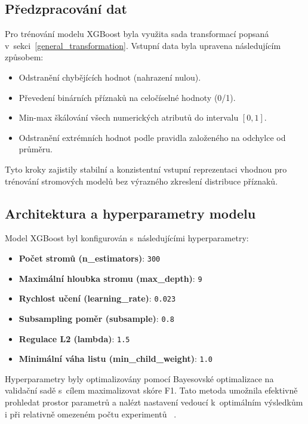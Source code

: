 \subsection{Předzpracování dat}

Pro trénování modelu XGBoost byla využita  sada transformací popsaná v~sekci~\ref{general_transformation}. Vstupní data byla upravena následujícím způsobem:
\begin{itemize}
    \item Odstranění chybějících hodnot (nahrazení nulou).
    \item Převedení binárních příznaků na celočíselné hodnoty (0/1).
    \item Min-max škálování všech numerických atributů do intervalu $[0, 1]$.
    \item Odstranění extrémních hodnot podle pravidla založeného na odchylce od průměru.
\end{itemize}

\noindent Tyto kroky zajistily stabilní a konzistentní vstupní reprezentaci vhodnou pro trénování stromových modelů bez výrazného zkreslení distribuce příznaků.

\subsection{Architektura a hyperparametry modelu}

Model XGBoost byl konfigurován s~následujícími hyperparametry:
\begin{itemize}
    \item \textbf{Počet stromů (n\_estimators)}: \texttt{300}
    \item \textbf{Maximální hloubka stromu (max\_depth)}: \texttt{9}
    \item \textbf{Rychlost učení (learning\_rate)}: \texttt{0.023}
    \item \textbf{Subsampling poměr (subsample)}: \texttt{0.8}
    \item \textbf{Regulace L2 (lambda)}: \texttt{1.5}
    \item \textbf{Minimální váha listu (min\_child\_weight)}: \texttt{1.0}
\end{itemize}

\noindent Hyperparametry byly optimalizovány pomocí Bayesovské optimalizace na validační sadě s~cílem maximalizovat skóre F1. Tato metoda umožnila efektivně prohledat prostor parametrů a nalézt nastavení vedoucí k~optimálním výsledkům i při relativně omezeném počtu experimentů ~\cite{snoek2012practical}.

